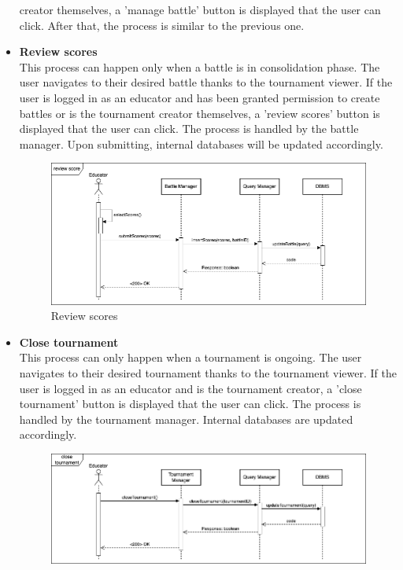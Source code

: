 \begin{itemize}
    creator themselves, a 'manage battle' button is displayed that the user can click. After that, the process is similar to the previous one.
    \newpage
    \item \textbf{Review scores}\\
    This process can happen only when a battle is in consolidation phase. The user navigates to their desired battle thanks to the tournament viewer. If the user is logged in as an 
    educator and has been granted permission to create battles or is the tournament creator themselves, a 'review scores' button is displayed that the user can click. 
    The process is handled by the battle manager. Upon submitting, internal databases will be updated accordingly.
    \begin{figure}[h]
        \centering
        \includegraphics[width=1\linewidth]{src/Review scores.png}
        \caption{Review scores}
        \label{fig:Review scores}
    \end{figure}
    \item \textbf{Close tournament}\\
    This process can only happen when a tournament is ongoing. The user navigates to their desired tournament thanks to the tournament viewer. If the user is logged in as an 
    educator and is the tournament creator, a 'close tournament' button is displayed that the user can click. The process is handled by the tournament manager. Internal databases are updated 
    accordingly.
    \begin{figure}[h]
        \centering
        \includegraphics[width=1\linewidth]{src/Close tournament.png}

\end{figure}
\end{itemize}
